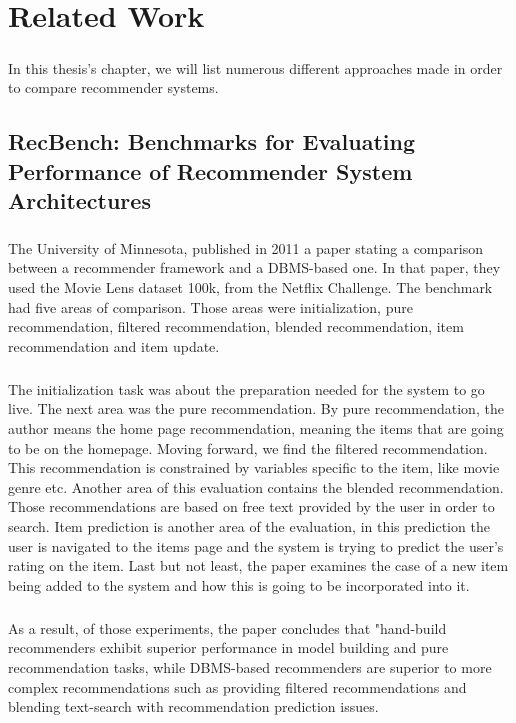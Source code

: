 \chapter{Related Work}
\paragraph{} In this thesis's chapter, we will list numerous different approaches made in order to compare recommender systems.

\section{RecBench: Benchmarks for Evaluating Performance of Recommender System Architectures \cite{levandoski2011recbench}}
\paragraph{} The University of Minnesota, published in 2011 a paper stating a comparison between a recommender framework and a DBMS-based one. In that paper, they used the Movie Lens dataset 100k, from the Netflix Challenge. The benchmark had five areas of comparison. Those areas were initialization, pure recommendation, filtered recommendation, blended recommendation, item recommendation and item update.

\paragraph{}The initialization task was about the preparation needed for the system to go live. The next area was the pure recommendation. By pure recommendation, the author means the home page recommendation, meaning the items that are going to be on the homepage. Moving forward, we find the filtered recommendation. This recommendation is constrained by variables specific to the item, like movie genre etc. Another area of this evaluation contains the blended recommendation. Those recommendations are based on free text provided by the user in order to search. Item prediction is another area of the evaluation, in this prediction the user is navigated to the items page and the system is trying to predict the user's rating on the item. Last but not least, the paper examines the case of a new item being added to the system and how this is going to be incorporated into it.

\paragraph{}As a result, of those experiments, the paper concludes that "hand-build recommenders exhibit superior performance in model building and pure recommendation tasks, while DBMS-based recommenders are superior to more complex recommendations such as providing filtered recommendations and blending text-search with recommendation prediction issues.

